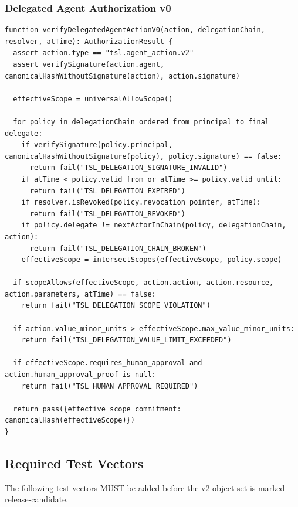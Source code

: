 \documentclass[11pt]{article}
\begin{document}
\subsubsection{Delegated Agent Authorization v0}

\begin{lstlisting}[style=tslcode]
function verifyDelegatedAgentActionV0(action, delegationChain, resolver, atTime): AuthorizationResult {
  assert action.type == "tsl.agent_action.v2"
  assert verifySignature(action.agent, canonicalHashWithoutSignature(action), action.signature)

  effectiveScope = universalAllowScope()

  for policy in delegationChain ordered from principal to final delegate:
    if verifySignature(policy.principal, canonicalHashWithoutSignature(policy), policy.signature) == false:
      return fail("TSL_DELEGATION_SIGNATURE_INVALID")
    if atTime < policy.valid_from or atTime >= policy.valid_until:
      return fail("TSL_DELEGATION_EXPIRED")
    if resolver.isRevoked(policy.revocation_pointer, atTime):
      return fail("TSL_DELEGATION_REVOKED")
    if policy.delegate != nextActorInChain(policy, delegationChain, action):
      return fail("TSL_DELEGATION_CHAIN_BROKEN")
    effectiveScope = intersectScopes(effectiveScope, policy.scope)

  if scopeAllows(effectiveScope, action.action, action.resource, action.parameters, atTime) == false:
    return fail("TSL_DELEGATION_SCOPE_VIOLATION")

  if action.value_minor_units > effectiveScope.max_value_minor_units:
    return fail("TSL_DELEGATION_VALUE_LIMIT_EXCEEDED")

  if effectiveScope.requires_human_approval and action.human_approval_proof is null:
    return fail("TSL_HUMAN_APPROVAL_REQUIRED")

  return pass({effective_scope_commitment: canonicalHash(effectiveScope)})
}
\end{lstlisting}

\subsection{Required Test Vectors}

The following test vectors MUST be added before the v2 object set is marked release-candidate.
\end{document}
